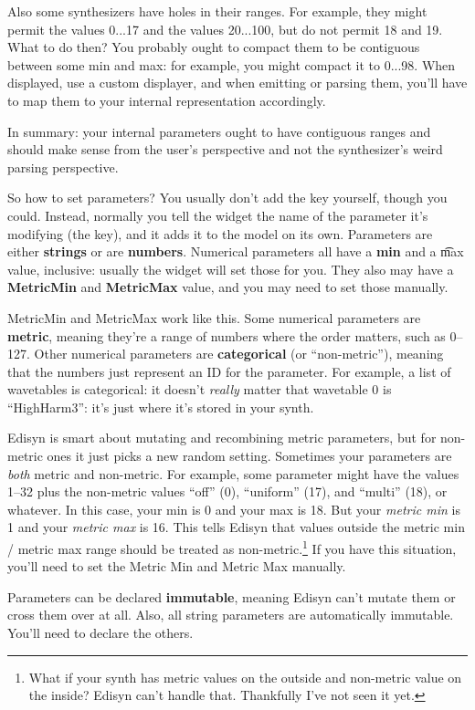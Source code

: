 \documentclass{article}
\begin{document}
Also some synthesizers have holes in their ranges.  For example, they might permit the values 0...17 and the values 20...100, but do not permit 18 and 19.  What to do then?  You probably ought to compact them to be contiguous between some min and max: for example, you might compact it to 0...98.  When displayed, use a custom displayer, and when emitting or parsing them, you'll have to map them to your internal representation accordingly. 

In summary: your internal parameters ought to have contiguous ranges and should make sense from the user's perspective and not the synthesizer's weird parsing perspective.

So how to set parameters?  You usually don't add the key yourself, though you could.  Instead, normally you tell the widget the name of the parameter it's modifying (the key), and it adds it to the model on its own.  Parameters are either {\bf strings} or are {\bf numbers}.   Numerical parameters all have a {\bf min} and a {\t max} value, inclusive: usually the widget will set those for you.  They also may have a {\bf MetricMin} and  {\bf MetricMax} value, and you may need to set those manually.  

MetricMin and MetricMax work like this.  Some numerical parameters are {\bf metric}, meaning they're a range of numbers where the order matters, such as 0--127.  Other numerical parameters are {\bf categorical} (or ``non-metric''), meaning that the numbers just represent an ID for the parameter.  For example, a list of wavetables is categorical: it doesn't {\it really} matter that wavetable 0 is ``HighHarm3'': it's just where it's stored in your synth.  

Edisyn is smart about mutating and recombining metric parameters, but for non-metric ones it just picks a new random setting.  Sometimes your parameters are {\it both} metric and non-metric.  For example, some parameter might have the values 1--32 plus the non-metric values ``off'' (0), ``uniform'' (17), and ``multi'' (18), or whatever.  In this case, your min is 0 and your max is 18.  But your {\it metric min} is 1 and your {\it metric max} is 16.  This tells Edisyn that values outside the metric min / metric max range should be treated as non-metric.\footnote{What if your synth has metric values on the outside and non-metric value on the inside? Edisyn can't handle that.  Thankfully I've not seen it yet.}  If you have this situation, you'll need to set the Metric Min and Metric Max manually.

Parameters can be declared {\bf immutable}, meaning Edisyn can't mutate them or cross them over at all.  Also, all string parameters are automatically immutable.  You'll need to declare the others.
\end{document}
